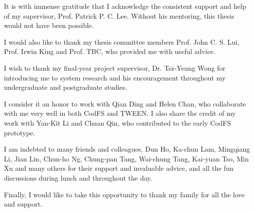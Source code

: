 It is with immense gratitude that I acknowledge the consistent support and help
of my supervisor, Prof. Patrick P. C. Lee. Without his mentoring, this thesis
would not have been possible.

I would also like to thank my thesis committee members Prof. John C. S. Lui,
Prof. Irwin King and Prof. TBC, who provided me with useful advice.

I wish to thank my final-year project supervisor, Dr. Tsz-Yeung Wong for
introducing me to system research and his encouragement throughout my
undergraduate and postgraduate studies.

I consider it an honor to work with Qian Ding and Helen Chan, who collaborate
with me very well in both CodFS and TWEEN. I also share the credit of my work
with Yan-Kit Li and Chuan Qin, who contributed to the early CodFS prototype.  

I am indebted to many friends and colleagues, Dun Ho, Ka-chun Lam, Mingqiang Li,
Jian Lin, Chun-ho Ng, Chung-pan Tang, Wai-chung Tang, Kai-yuan Tso, Min Xu and
many others for their support and invaluable advice, and all the fun discussions
during lunch and throughout the day. 

Finally, I would like to take this opportunity to thank my family for all the
love and support.
